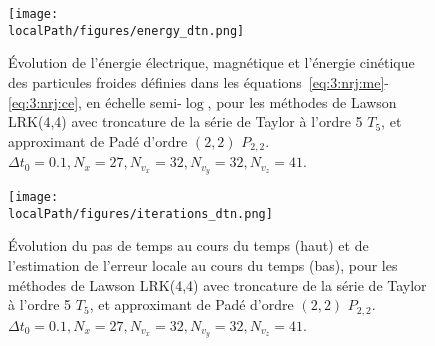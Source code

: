 \begin{figure}[h]
  \centering
  \texttt{[image: \\localPath/figures/energy\_dtn.png]}
  \caption{Évolution de l'énergie électrique, magnétique et l'énergie cinétique des particules froides définies dans les équations~\ref{eq:3:nrj:me}-\ref{eq:3:nrj:ce}, en échelle semi-$\log$, pour les méthodes de Lawson LRK(4,4) avec troncature de la série de Taylor à l'ordre 5 $T_5$, et approximant de Padé d'ordre $(2,2)$ $P_{2,2}$. $\Delta t_0 = 0.1, N_x=27, N_{v_x}=32, N_{v_y}=32, N_{v_z}=41$.}
  \label{fig:approx:energies:dtn}
\end{figure}

\begin{figure}[h]
  \centering
  \texttt{[image: \\localPath/figures/iterations\_dtn.png]}
  \caption{Évolution du pas de temps au cours du temps (haut) et de l'estimation de l'erreur locale au cours du temps (bas), pour les méthodes de Lawson LRK(4,4) avec troncature de la série de Taylor à l'ordre 5 $T_5$, et approximant de Padé d'ordre $(2,2)$ $P_{2,2}$. $\Delta t_0 = 0.1, N_x=27, N_{v_x}=32, N_{v_y}=32, N_{v_z}=41$.}
  \label{fig:approx:iterations:dtn}
\end{figure}

